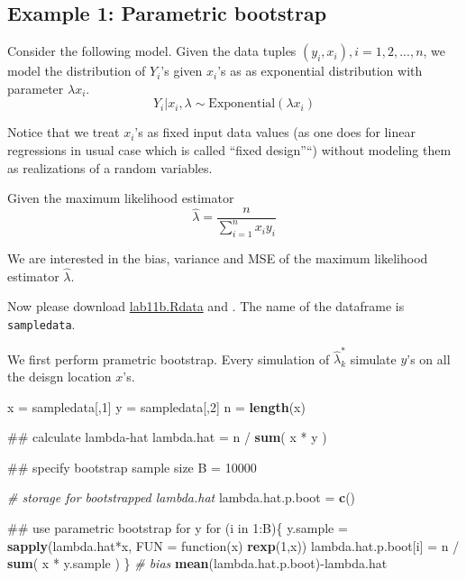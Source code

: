 \documentclass[]{article}
\newenvironment{Shaded}{\begin{snugshade}}{\end{snugshade}}
\newcommand{\KeywordTok}[1]{\textcolor[rgb]{0.13,0.29,0.53}{\textbf{{#1}}}}
\newcommand{\DataTypeTok}[1]{\textcolor[rgb]{0.13,0.29,0.53}{{#1}}}
\newcommand{\DecValTok}[1]{\textcolor[rgb]{0.00,0.00,0.81}{{#1}}}
\newcommand{\StringTok}[1]{\textcolor[rgb]{0.31,0.60,0.02}{{#1}}}
\newcommand{\CommentTok}[1]{\textcolor[rgb]{0.56,0.35,0.01}{\textit{{#1}}}}
\newcommand{\NormalTok}[1]{{#1}}
\begin{document}
\subsection{Example 1: Parametric
bootstrap}\label{example-1-parametric-bootstrap}

Consider the following model. Given the data tuples
\((y_i , x_i), i = 1, 2, ... , n\), we model the distribution of
\(Y_i\)'s given \(x_i\)'s as as exponential distribution with parameter
\(\lambda x_i\). \[
Y_i | x_i , \lambda \sim \mathrm{Exponential}(\lambda x_i)
\]

Notice that we treat \(x_i\)'s as fixed input data values (as one does
for linear regressions in usual case which is called ``fixed design''``)
without modeling them as realizations of a random variables.

Given the maximum likelihood estimator \[
\hat\lambda = \frac{n}{\sum_{i=1}^n x_i y_i}
\]

We are interested in the bias, variance and MSE of the maximum
likelihood estimator \(\hat\lambda\).

Now please download \href{}{lab11b.Rdata} and . The name of the
dataframe is \texttt{sampledata}.

We first perform prametric bootstrap. Every simulation of
\(\hat\lambda_k^*\) simulate \(y\)'s on all the deisgn location \(x\)'s.

\begin{Shaded}
\begin{Highlighting}[]
\NormalTok{x =}\StringTok{ }\NormalTok{sampledata[,}\DecValTok{1}\NormalTok{]}
\NormalTok{y =}\StringTok{ }\NormalTok{sampledata[,}\DecValTok{2}\NormalTok{]}
\NormalTok{n =}\StringTok{ }\KeywordTok{length}\NormalTok{(x)}

\NormalTok{## calculate lambda-hat}
\NormalTok{lambda.hat =}\StringTok{ }\NormalTok{n /}\StringTok{ }\KeywordTok{sum}\NormalTok{( x *}\StringTok{ }\NormalTok{y )}

\NormalTok{## specify bootstrap sample size}
\NormalTok{B =}\StringTok{ }\DecValTok{10000}

\CommentTok{# storage for bootstrapped lambda.hat}
\NormalTok{lambda.hat.p.boot =}\StringTok{ }\KeywordTok{c}\NormalTok{() }

\NormalTok{## use parametric bootstrap for y}
\NormalTok{for (i in }\DecValTok{1}\NormalTok{:B)\{}
    \NormalTok{y.sample =}\StringTok{ }\KeywordTok{sapply}\NormalTok{(lambda.hat*x, }\DataTypeTok{FUN =} \NormalTok{function(x) }\KeywordTok{rexp}\NormalTok{(}\DecValTok{1}\NormalTok{,x))}
    \NormalTok{lambda.hat.p.boot[i] =}\StringTok{ }\NormalTok{n /}\StringTok{ }\KeywordTok{sum}\NormalTok{( x *}\StringTok{ }\NormalTok{y.sample )}
\NormalTok{\}}
\CommentTok{# bias}
\KeywordTok{mean}\NormalTok{(lambda.hat.p.boot)-lambda.hat}
\end{Highlighting}
\end{Shaded}
\end{document}
